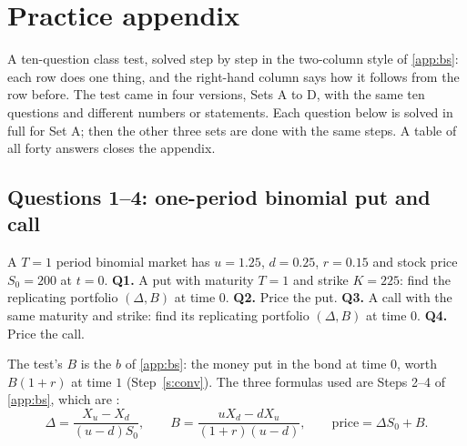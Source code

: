 \chapter{Practice appendix}\label{app:practice}

A ten-question class test, solved step by step in the two-column style of \cref{app:bs}: each row does one thing, and the right-hand column says how it follows from the row before. The test came in four versions, Sets A to D, with the same ten questions and different numbers or statements. Each question below is solved in full for Set A; then the other three sets are done with the same steps. A table of all forty answers closes the appendix.

\section*{Questions 1--4: one-period binomial put and call}

\begin{question}
A $T=1$ period binomial market has $u=1.25$, $d=0.25$, $r=0.15$ and stock price $S_0=200$ at $t=0$.
\textbf{Q1.} A put with maturity $T=1$ and strike $K=225$: find the replicating portfolio $(\Delta,B)$ at time $0$.
\textbf{Q2.} Price the put.
\textbf{Q3.} A call with the same maturity and strike: find its replicating portfolio $(\Delta,B)$ at time $0$.
\textbf{Q4.} Price the call.
\end{question}

The test's $B$ is the $b$ of \cref{app:bs}: the money put in the bond at time $0$, worth $B(1+r)$ at time $1$ (Step~\ref{s:conv}). The three formulas used are Steps 2--4 of \cref{app:bs}, which are :
\[
  \Delta=\frac{X_u-X_d}{(u-d)S_0},\qquad B=\frac{uX_d-dX_u}{(1+r)(u-d)},\qquad\text{price}=\Delta S_0+B.
\]

